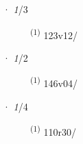 \ENTRYEND
\noindent{} · \textit{1}/3 \LEMMALINE
\begin{description}
    \item[]  \textsuperscript{(1)} \mbox{123v12/}
\end{description}
\ENTRYEND
\noindent{} · \textit{1}/2 \LEMMALINE
\begin{description}
    \item[]  \textsuperscript{(1)} \mbox{146v04/}
\end{description}
\ENTRYEND
\noindent{} · \textit{1}/4 \LEMMALINE
\begin{description}
    \item[]  \textsuperscript{(1)} \mbox{110r30/}
\end{description}
\ENTRYEND
